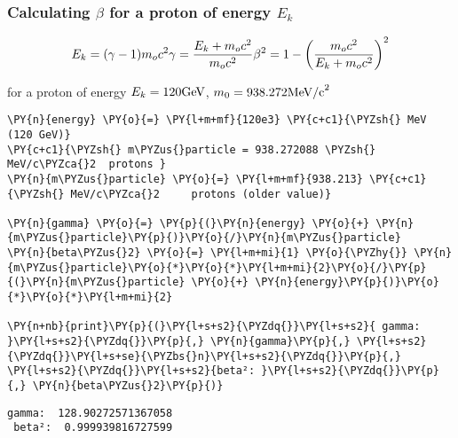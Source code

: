 \hypertarget{calculating-beta-for-a-proton-of-energy-e_k}{%
\subsubsection{\texorpdfstring{Calculating \(\beta\) for a proton of
energy
\(E_k\)}{Calculating \textbackslash beta for a proton of energy E\_k}}\label{calculating-beta-for-a-proton-of-energy-e_k}}

\[
E_k = (\gamma - 1) m_o c^2 \\
\gamma = \frac{E_k + m_o c^2}{m_o c^2} \\
\beta^2 = 1 - \left(\frac{m_o c^2}{E_k +m_o c^2} \right)^2
\]

for a proton of energy \(E_k=120\space \text{GeV}\),
\(m_0 = 938.272\space \text{MeV/c}^2\)

    \begin{tcolorbox}[breakable, size=fbox, boxrule=1pt, pad at break*=1mm,colback=cellbackground, colframe=cellborder]
\begin{Verbatim}[commandchars=\\\{\}]
\PY{n}{energy} \PY{o}{=} \PY{l+m+mf}{120e3} \PY{c+c1}{\PYZsh{} MeV  (120 GeV)}
\PY{c+c1}{\PYZsh{} m\PYZus{}particle = 938.272088 \PYZsh{} MeV/c\PYZca{}2  protons }
\PY{n}{m\PYZus{}particle} \PY{o}{=} \PY{l+m+mf}{938.213} \PY{c+c1}{\PYZsh{} MeV/c\PYZca{}2     protons (older value)}

\PY{n}{gamma} \PY{o}{=} \PY{p}{(}\PY{n}{energy} \PY{o}{+} \PY{n}{m\PYZus{}particle}\PY{p}{)}\PY{o}{/}\PY{n}{m\PYZus{}particle}
\PY{n}{beta\PYZus{}2} \PY{o}{=} \PY{l+m+mi}{1} \PY{o}{\PYZhy{}} \PY{n}{m\PYZus{}particle}\PY{o}{*}\PY{o}{*}\PY{l+m+mi}{2}\PY{o}{/}\PY{p}{(}\PY{n}{m\PYZus{}particle} \PY{o}{+} \PY{n}{energy}\PY{p}{)}\PY{o}{*}\PY{o}{*}\PY{l+m+mi}{2}

\PY{n+nb}{print}\PY{p}{(}\PY{l+s+s2}{\PYZdq{}}\PY{l+s+s2}{ gamma: }\PY{l+s+s2}{\PYZdq{}}\PY{p}{,} \PY{n}{gamma}\PY{p}{,} \PY{l+s+s2}{\PYZdq{}}\PY{l+s+se}{\PYZbs{}n}\PY{l+s+s2}{\PYZdq{}}\PY{p}{,} \PY{l+s+s2}{\PYZdq{}}\PY{l+s+s2}{beta²: }\PY{l+s+s2}{\PYZdq{}}\PY{p}{,} \PY{n}{beta\PYZus{}2}\PY{p}{)}
\end{Verbatim}
\end{tcolorbox}

    \begin{Verbatim}[commandchars=\\\{\}]
 gamma:  128.90272571367058
 beta²:  0.999939816727599
    \end{Verbatim}

